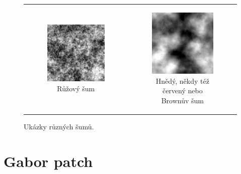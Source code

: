 \begin{figure}[h!]
\begin{tabular}{cc}
\begin{subfigure}{0.45\textwidth}
  \centering
  \includegraphics[width=.8\linewidth]{img/pink_noise}
  \caption{Růžový šum} 
\end{subfigure}&
\begin{subfigure}{0.45\textwidth}
  \centering
  \includegraphics[width=.8\linewidth]{img/brown_noise}
  \caption{Hnědý, někdy též červený nebo Brownův šum} 
\end{subfigure}%
\end{tabular} 
\caption{Ukázky různých šumů.} 
\label{obr:noise:example} 
 
\end{figure}
\section{Gabor patch}


